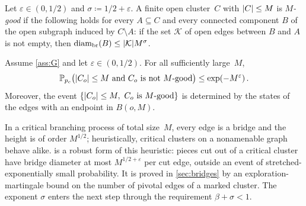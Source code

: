 \begin{definition}\label{def:good}
Let $\varepsilon\in(0,1/2)$ and $\sigma\coloneqq1/2+\varepsilon$. A finite open cluster~$C$ with
$\lvert C\rvert\le M$ is \emph{$M$-good} if the following holds for every $A\subseteq C$ and every connected
component $B$ of the open subgraph induced by $C\setminus A$: if the set $\mathcal K$ of open edges
between $B$ and $A$ is not empty, then $\operatorname{diam}_{\mathrm{br}}(B)\le\lvert\mathcal K\rvert M^\sigma$.
\end{definition}

\begin{proposition}\label{prop:good}
Assume \cref{ass:G} and let $\varepsilon\in(0,1/2)$. For all sufficiently large~$M$,
\begin{equation*}
  \mathbb P_{p_c}\bigl(\lvert C_o\rvert\le M \text{ and } C_o \text{ is not $M$-good}\bigr)\le\exp(-M^\varepsilon)\,.
\end{equation*}
Moreover, the event $\{\abs{C_o}\le M,\ C_o\text{ is $M$-good}\}$ is determined by the states of the
edges with an endpoint in $B(o,M)$.
\end{proposition}

In a critical branching process of total size~$M$, every edge is a bridge and the height is of order
$M^{1/2}$; heuristically, critical clusters on a nonamenable graph behave alike.  is a
robust form of this heuristic: pieces cut out of a critical cluster have bridge diameter at most
$M^{1/2+\varepsilon}$ per cut edge, outside an event of stretched-exponentially small probability. It
is proved in \cref{sec:bridges} by an exploration-martingale bound on the number of pivotal edges of a
marked cluster. The exponent $\sigma$ enters the next step through the requirement $\beta+\sigma<1$.

